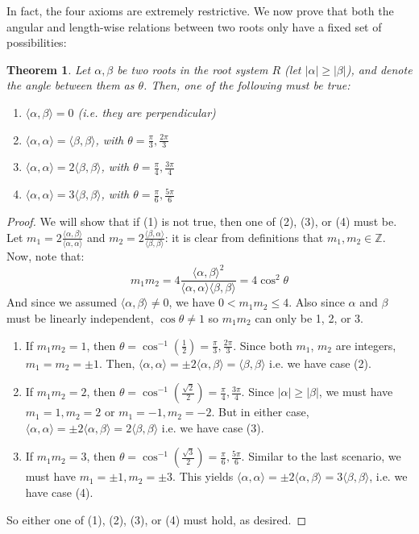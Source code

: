 \documentclass{article}
\newtheorem{theorem}{Theorem}
\theoremstyle{definition}
\begin{document}
In fact, the four axioms are extremely restrictive. We now prove that both the angular and length-wise relations between two roots only have a fixed set of possibilities: 
\begin{theorem}
Let $\alpha,\beta$ be two roots in the root system $R$ (let $|\alpha|\geq|\beta|$), and denote the angle between them as $\theta$. Then, one of the following must be true: 
\begin{enumerate}
    \item $\langle\alpha,\beta\rangle=0$ (i.e. they are perpendicular)
    \item $\langle\alpha,\alpha\rangle=\langle\beta,\beta\rangle$, with $\theta=\frac{\pi}{3},\frac{2\pi}{3}$
    \item $\langle\alpha,\alpha\rangle=2\langle\beta,\beta\rangle$, with $\theta=\frac{\pi}{4},\frac{3\pi}{4}$
    \item $\langle\alpha,\alpha\rangle=3\langle\beta,\beta\rangle$, with $\theta=\frac{\pi}{6},\frac{5\pi}{6}$
\end{enumerate}
\end{theorem}
\begin{proof}
We will show that if (1) is not true, then one of (2), (3), or (4) must be. Let $m_1=2\frac{\langle\alpha,\beta\rangle}{\langle\alpha,\alpha\rangle}$ and $m_2=2\frac{\langle\beta, \alpha\rangle}{\langle\beta,\beta\rangle}$: it is clear from definitions that $m_1,m_2\in\mathbb{Z}$. Now, note that: 
$$m_1 m_2=4\frac{\langle\alpha,\beta\rangle^2}{\langle\alpha,\alpha\rangle\langle\beta,\beta\rangle}=4\cos^2\theta$$
And since we assumed $\langle\alpha,\beta\rangle\neq0$, we have $0<m_1m_2\leq4$. Also since $\alpha$ and $\beta$ must be linearly independent, $\cos\theta\neq1$ so $m_1m_2$ can only be 1, 2, or 3. 
\begin{enumerate}
    \item If $m_1m_2=1$, then $\theta=\cos^{-1}(\frac{1}{2})=\frac{\pi}{3},\frac{2\pi}{3}$. Since both $m_1$, $m_2$ are integers, $m_1=m_2=\pm1$. Then, $\langle\alpha,\alpha\rangle=\pm2\langle\alpha,\beta\rangle=\langle\beta,\beta\rangle$ i.e. we have case (2). 
    \item If $m_1m_2=2$, then $\theta=\cos^{-1}(\frac{\sqrt{2}}{2})=\frac{\pi}{4},\frac{3\pi}{4}$. Since $|\alpha|\geq|\beta|$, we must have $m_1=1,m_2=2$ or $m_1=-1,m_2=-2$. But in either case,  $\langle\alpha,\alpha\rangle=\pm2\langle\alpha,\beta\rangle=2\langle\beta,\beta\rangle$ i.e. we have case (3). 
    \item If $m_1m_2=3$, then $\theta=\cos^{-1}(\frac{\sqrt{3}}{2})=\frac{\pi}{6},\frac{5\pi}{6}$. Similar to the last scenario, we must have $m_1=\pm1,m_2=\pm3$. This yields $\langle\alpha,\alpha\rangle=\pm2\langle\alpha,\beta\rangle=3\langle\beta,\beta\rangle$, i.e. we have case (4). 
\end{enumerate}
So either one of (1), (2), (3), or (4) must hold, as desired. 
\end{proof}
\end{document}
